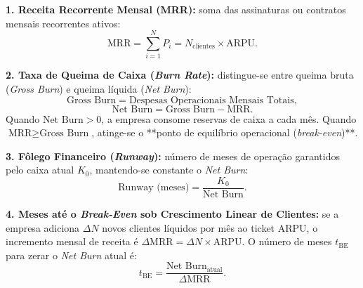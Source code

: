 \begin{boxFormula}
  \textbf{1. Receita Recorrente Mensal (MRR):} soma das assinaturas ou contratos mensais recorrentes ativos:
  \[
    \text{MRR} = \sum_{i=1}^{N} P_i = N_{\text{clientes}} \times \text{ARPU}.
  \]

  \textbf{2. Taxa de Queima de Caixa (\textit{Burn Rate}):} distingue-se entre queima bruta (\textit{Gross Burn}) e queima líquida (\textit{Net Burn}):
  \[
    \text{Gross Burn} = \text{Despesas Operacionais Mensais Totais},
  \]
  \[
    \text{Net Burn} = \text{Gross Burn} - \text{MRR}.
  \]
  Quando $\text{Net Burn} > 0$, a empresa consome reservas de caixa a cada mês. Quando $\text{MRR} \ge \text{Gross Burn}$, atinge-se o **ponto de equilíbrio operacional (\textit{break-even})**.

  \textbf{3. Fôlego Financeiro (\textit{Runway}):} número de meses de operação garantidos pelo caixa atual $K_0$, mantendo-se constante o \textit{Net Burn}:
  \[
    \text{Runway (meses)} = \frac{K_0}{\text{Net Burn}}.
  \]

  \textbf{4. Meses até o \textit{Break-Even} sob Crescimento Linear de Clientes:} se a empresa adiciona $\Delta N$ novos clientes líquidos por mês ao ticket $\text{ARPU}$, o incremento mensal de receita é $\Delta \text{MRR} = \Delta N \times \text{ARPU}$. O número de meses $t_{\text{BE}}$ para zerar o \textit{Net Burn} atual é:
  \[
    t_{\text{BE}} = \frac{\text{Net Burn}_{\text{atual}}}{\Delta \text{MRR}}.
  \]
\end{boxFormula}


